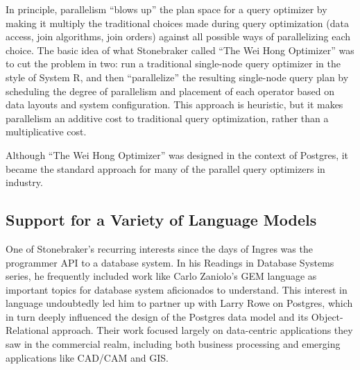 \documentclass[sigconf,natbib=false]{acmart}
\begin{document}
In principle, parallelism ``blows up'' the plan space for a query optimizer by making it multiply the traditional choices made during query optimization (data access, join algorithms, join orders) against all possible ways of parallelizing each choice. The basic idea of what Stonebraker called ``The Wei Hong Optimizer'' was to cut the problem in two: run a traditional single-node query optimizer in the style of System R, and then ``parallelize'' the resulting single-node query plan by scheduling the degree of parallelism and placement of each operator based on data layouts and system configuration. This approach is heuristic, but it makes parallelism an additive cost to traditional query optimization, rather than a multiplicative cost. 

Although ``The Wei Hong Optimizer'' was designed in the context of Postgres, it became the standard approach for many of the parallel query optimizers in industry.

\subsection{Support for a Variety of Language Models}

One of Stonebraker's recurring interests since the days of Ingres was the programmer API to a database system. In his Readings in Database Systems series, he frequently included work like Carlo Zaniolo's GEM language as important topics for database system aficionados to understand. This interest in language undoubtedly led him to partner up with Larry Rowe on Postgres, which in turn deeply influenced the design of the Postgres data model and its Object-Relational approach. Their work focused largely on data-centric applications they saw in the commercial realm, including both business processing and emerging applications like CAD/CAM and GIS. 
\end{document}
